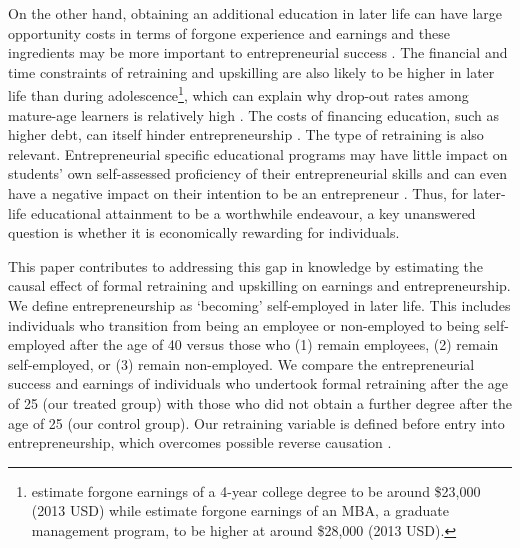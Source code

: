 \documentclass[12pt, a4paper]{article}
\begin{document}
On the other hand, obtaining an additional education in later life can have large opportunity costs in terms of forgone experience and earnings \citep{haber2007, montgomery2006} and these ingredients may be more important to entrepreneurial success \citep{zhao2021, weber2004}. The financial and time constraints of retraining and upskilling are also likely to be higher in later life than during adolescence\footnote{\cite{abel2014} estimate forgone earnings of a 4-year college degree to be around \$23,000 (2013 USD) while \cite{montgomery2006} estimate forgone earnings of an MBA, a graduate management program, to be higher at around \$28,000 (2013 USD).}, which can explain why drop-out rates among mature-age learners is relatively high \citep{cherastidtham2018, hanson2022, guerra2022}. The costs of financing education, such as higher debt, can itself hinder entrepreneurship \citep{krishnan2019}. The type of retraining is also relevant. Entrepreneurial specific educational programs may have little impact on students’ own self-assessed proficiency of their entrepreneurial skills and can even have a negative impact on their intention to be an entrepreneur \citep{oosterbeek2010}. Thus, for later-life educational attainment to be a worthwhile endeavour, a key unanswered question is whether it is economically rewarding for individuals. 

This paper contributes to addressing this gap in knowledge by estimating the causal effect of formal retraining and upskilling on earnings and entrepreneurship. We define entrepreneurship as ‘becoming’ self-employed in later life. This includes individuals who transition from being an employee or non-employed to being self-employed after the age of 40 versus those who (1) remain employees, (2) remain self-employed, or (3) remain non-employed. We compare the entrepreneurial success and earnings of individuals who undertook formal retraining after the age of 25 (our treated group) with those who did not obtain a further degree after the age of 25 (our control group). Our retraining variable is defined before entry into entrepreneurship, which overcomes possible reverse causation \citep{cassar2006}. 
\end{document}
